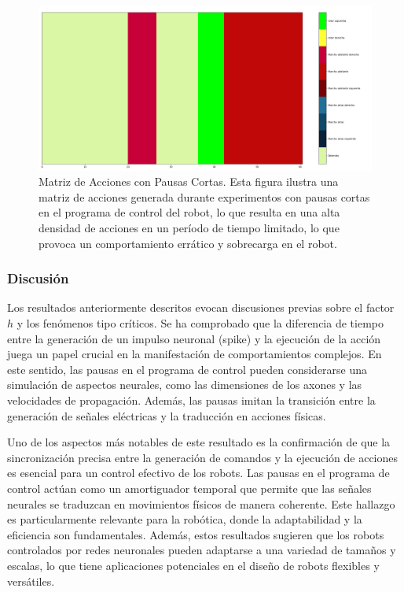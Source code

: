 \begin{figure}[h!]
	\centering\includegraphics[width=\imsize]{pause_alto.pdf}
	\caption[ Matriz de Acciones con Pausas Cortas.]{ Matriz de Acciones con Pausas Cortas. Esta figura ilustra una matriz de acciones generada durante experimentos con pausas cortas en el programa de control del robot, lo que resulta en una alta densidad de acciones en un período de tiempo limitado, lo que provoca un comportamiento errático y sobrecarga en el robot. }\label{fig:pause_alto}
\end{figure}

\subsubsection{Discusión }

Los resultados anteriormente descritos evocan discusiones previas sobre el factor $h$ y los fenómenos tipo críticos. Se ha comprobado que la diferencia de tiempo entre la generación de un impulso neuronal (spike) y la ejecución de la acción juega un papel crucial en la manifestación de comportamientos complejos. En este sentido, las pausas en el programa de control pueden considerarse una simulación de aspectos neurales, como las dimensiones de los axones y las velocidades de propagación. Además, las pausas imitan la transición entre la generación de señales eléctricas y la traducción en acciones físicas.

Uno de los aspectos más notables de este resultado es la confirmación de que la sincronización precisa entre la generación de comandos y la ejecución de acciones es esencial para un control efectivo de los robots. Las pausas en el programa de control actúan como un amortiguador temporal que permite que las señales neurales se traduzcan en movimientos físicos de manera coherente. Este hallazgo es particularmente relevante para la robótica, donde la adaptabilidad y la eficiencia son fundamentales. Además, estos resultados sugieren que los robots controlados por redes neuronales pueden adaptarse a una variedad de tamaños y escalas, lo que tiene aplicaciones potenciales en el diseño de robots flexibles y versátiles.

